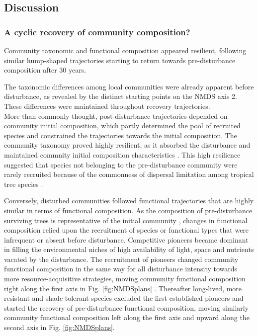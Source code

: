 \documentclass[
  11pt,
  french,
  A4paper,
  extrafontsizes,onecolumn,openright
  ]{memoir}
\begin{document}
\subsection{Discussion}\label{discussion-1}

\subsubsection{A cyclic recovery of community
composition?}\label{a-cyclic-recovery-of-community-composition}

Community taxonomic and functional composition appeared resilient,
following similar hump-shaped trajectories starting to return towards
pre-disturbance composition after 30 years.

The taxonomic differences among local communities were already apparent
before disturbance, as revealed by the distinct starting points on the
NMDS axis 2. These differences were maintained throughout recovery
trajectories.\\
More than commonly thought, post-disturbance trajectories depended on
community initial composition, which partly determined the pool of
recruited species and constrained the trajectories towards the initial
composition. The community taxonomy proved highly resilient, as it
absorbed the disturbance and maintained commnity initial composition
characteristics \autocite{Folke2006}. This high resilience suggested
that species not belonging to the pre-disturbance community were rarely
recruited because of the commonness of dispersal limitation among
tropical tree species \autocite{Svenning2005}.

Conversely, disturbed communities followed functional trajectories that
are highly similar in terms of functional composition. As the
composition of pre-disturbance surviving trees is representative of the
initial community \autocite{Herault2018}, changes in functional
composition relied upon the recruitment of species or functional types
that were infrequent or absent before disturbance. Competitive pioneers
became dominant in filling the environmental niches of high availability
of light, space and nutrients vacated by the disturbance. The
recruitment of pioneers changed community functional composition in the
same way for all disturbance intensity towards more resource-acquisitive
strategies, moving community functional composition right along the
first axis in Fig. \ref{fig:NMDSplans}
\autocites{Westoby1998}{Wright2004}{Reich2014}. Thereafter long-lived,
more resistant and shade-tolerant species excluded the first established
pioneers and started the recovery of pre-disturbance functional
composition, moving similarly community functional composition left
along the first axis and upward along the second axis in Fig.
\ref{fig:NMDSplans}.
\end{document}
